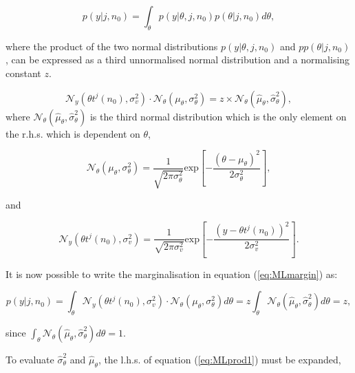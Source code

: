 \begin{equation}\label{eq:MLmargin}
p(y|j,n_0)=\int_\theta p(y|\theta, j, n_0) p(\theta|j,n_0) d\theta,
\end{equation}

where the product of the two normal distributions $p(y|\theta, j, n_0)$ and $pp(\theta|j,n_0)$, can be expressed as a third unnormalised normal distribution and a normalising constant $z$.

\begin{equation}\label{eq:MLprod1}
\mathcal{N}_y(\theta t^j(n_0),\sigma_v^2)\cdot\mathcal{N}_\theta(\mu_\theta,\sigma^2_\theta) = z \times \mathcal{N}_\theta(\hat{\mu}_\theta,\hat{\sigma}^2_\theta),
\end{equation}
where $\mathcal{N}_\theta(\hat{\mu}_\theta,\hat{\sigma}_\theta^2)$ is the third normal distribution which is the only element on the r.h.s. which is dependent on $\theta$,

\begin{equation}\label{eq:MLtheta2}
\mathcal{N}_\theta(\mu_\theta,\sigma^2_\theta) = \frac{1}{\sqrt{2 \pi \sigma_\theta^2}} \textrm{exp}\left[-\frac{\left(\theta - \mu_\theta\right)^2}{2\sigma_\theta^2}\right],
\end{equation}

and

\begin{equation}\label{eq:MLnoise2}
\mathcal{N}_y(\theta t^j(n_0),\sigma_v^2) = \frac{1}{\sqrt{2 \pi \sigma_v^2}} \textrm{exp}\left[-\frac{\left(y - \theta t^j\left(n_0\right)\right)^2}{2\sigma_v^2}\right].
\end{equation}

It is now possible to write the marginalisation in equation (\ref{eq:MLmargin}) as:

\begin{equation}\label{eq:MLmargin2}
p(y|j,n_0)=\int_\theta \mathcal{N}_y(\theta t^j(n_0),\sigma_v^2)\cdot\mathcal{N}_\theta(\mu_\theta,\sigma^2_\theta) d\theta = z \int_\theta \mathcal{N}_\theta(\hat{\mu}_\theta,\hat{\sigma}^2_\theta) d\theta = z,
\end{equation}

since $\int_\theta \mathcal{N}_\theta(\hat{\mu}_\theta,\hat{\sigma}^2_\theta) d\theta = 1$.

To evaluate $\hat{\sigma}^2_\theta$ and $\hat{\mu}_\theta$, the l.h.s. of equation (\ref{eq:MLprod1}) must be expanded,

